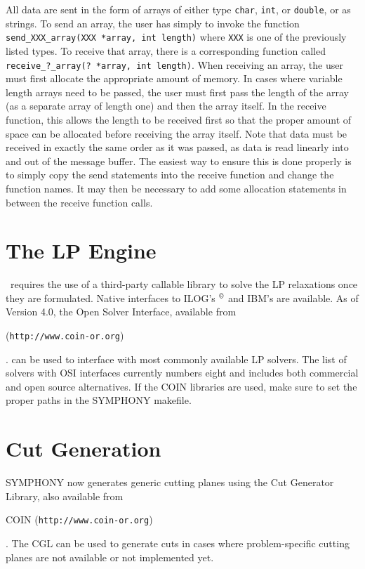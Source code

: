 All data are sent in the form of arrays of either type {\tt char}, {\tt int},
or {\tt double}, or as strings. To send an array, the user has simply to
invoke the function {\tt send\_XXX\_array(XXX *array, int length)} where
\texttt{XXX} is one of the previously listed types. To receive that array,
there is a corresponding function called {\tt receive\_?\_array(?  *array, int
length)}. When receiving an array, the user must first allocate the
appropriate amount of memory. In cases where variable length arrays need to be
passed, the user must first pass the length of the array (as a separate array
of length one) and then the array itself. In the receive function, this allows
the length to be received first so that the proper amount of space can be
allocated before receiving the array itself. Note that data must be received
in exactly the same order as it was passed, as data is read linearly into and
out of the message buffer. The easiest way to ensure this is done properly is
to simply copy the send statements into the receive function and change the
function names. It may then be necessary to add some allocation statements in
between the receive function calls.

\section{The LP Engine}

\BB\ requires the use of a third-party callable library to solve the LP 
relaxations once they are formulated. Native interfaces to ILOG's
$^{\copyright}$
and IBM's
are available. As of Version 4.0, the Open Solver Interface, available from
\begin{latexonly} 
(\texttt{http://www.coin-or.org})
\end{latexonly}.
can be used to interface with most commonly available LP solvers. The list of
solvers with OSI interfaces currently numbers eight and includes both
commercial and open source alternatives. If the COIN libraries are used, make
sure to set the proper paths in the SYMPHONY makefile.

\section{Cut Generation}

SYMPHONY now generates generic cutting planes using the Cut Generator Library,
also available from 
\begin{latexonly} 
COIN (\texttt{http://www.coin-or.org})
\end{latexonly}.
The CGL can be used to generate cuts in cases where problem-specific cutting
planes are not available or not implemented yet. 

